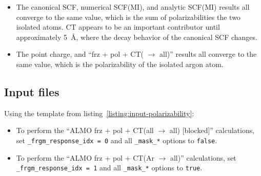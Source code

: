 \begin{itemize}
\item The canonical SCF, numerical SCF(MI), and analytic SCF(MI) results all converge to the same value, which is the sum of polarizabilities the two isolated atoms. CT appears to be an important contributor until approximately \SI{5}{\angstrom}, where the decay behavior of the canonical SCF changes.
\item The point charge, and ``frz + pol + CT( \(\rightarrow\) all)'' results all converge to the same value, which is the polarizability of the isolated argon atom.
\end{itemize}

\subsection{Input files}



Using the template from listing~\ref{listing:input-polarizability}:

\begin{itemize}
\item To perform the ``ALMO frz + pol + CT(all \(\rightarrow\) all) [blocked]'' calculations, set \lstinline|_frgm_response_idx = 0| and all \lstinline|_mask_*| options to \lstinline|false|.
\item To perform the ``ALMO frz + pol + CT(Ar \(\rightarrow\) all)'' calculations, set \lstinline|_frgm_response_idx = 1| and all \lstinline|_mask_*| options to \lstinline|true|.
\end{itemize}

